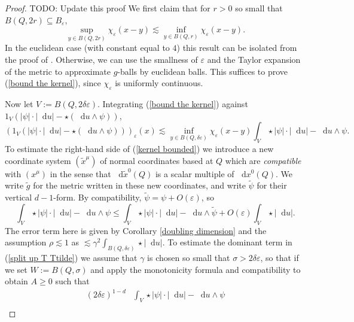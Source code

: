 \documentclass[reqno,10pt]{amsart}
\newcommand*\dif{\mathop{}\!\mathrm{d}}
\newcommand{\dfn}[1]{\emph{#1}\index{#1}}
\theoremstyle{definition}
\numberwithin{equation}{section}
\begin{document}
\begin{proof}
TODO: Update this proof We first claim that for $r > 0$ so small that $B(Q, 2r) \subseteq B_\varepsilon$,
\begin{equation}\label{bound the kernel}
\sup_{y \in B(Q, 2r)} \chi_\varepsilon(x - y) \lesssim \inf_{y \in B(Q, r)} \chi_\varepsilon(x - y).
\end{equation}
In the euclidean case (with constant equal to $4$) this result can be isolated from the proof of \cite[Theorem 7.3]{Giusti77}.
Otherwise, we can use the smallness of $\varepsilon$ and the Taylor expansion of the metric to approximate $g$-balls by euclidean balls.
This suffices to prove (\ref{bound the kernel}), since $\chi_\varepsilon$ is uniformly continuous.

Now let $V := B(Q, 2\delta\varepsilon)$.
Integrating (\ref{bound the kernel}) against $1_V(|\psi| \cdot |\dif u| - \star(\dif u \wedge \psi))$,
\begin{equation}\label{kernel bounded}
(1_V(|\psi| \cdot |\dif u| - \star(\dif u \wedge \psi)))_\varepsilon(x) \lesssim \inf_{y \in B(Q, \delta\varepsilon)} \chi_\varepsilon(x - y) \int_V \star |\psi| \cdot |\dif u| - \dif u \wedge \psi.
\end{equation}
To estimate the right-hand side of (\ref{kernel bounded}) we introduce a new coordinate system $(\tilde x^\mu)$ of normal coordinates based at $Q$ which are \dfn{compatible} with $(x^\mu)$ in the sense that $\dif \tilde x^0(Q)$ is a scalar multiple of $\dif x^0(Q)$.
We write $\tilde g$ for the metric written in these new coordinates, and write $\tilde \psi$ for their vertical $d-1$-form.
By compatibility, $\tilde \psi = \psi + O(\varepsilon)$, so
\begin{equation}\label{split up T Ttilde}
\int_V \star |\psi| \cdot |\dif u| - \dif u \wedge \psi \leq \int_V \star |\psi| \cdot |\dif u| - \dif u \wedge \tilde \psi + O(\varepsilon) \int_V \star |\dif u|.
\end{equation}
The error term here is given by Corollary \ref{doubling dimension} and the assumption $\rho \lesssim 1$ as $\lesssim \gamma^2 \int_{B(Q, \delta\varepsilon)} \star |\dif u|$.
To estimate the dominant term in (\ref{split up T Ttilde}) we assume that $\gamma$ is chosen so small that $\sigma > 2\delta\varepsilon$, so that if we set $W := B(Q, \sigma)$ and apply the monotonicity formula and compatibility to obtain $A \geq 0$ such that
\begin{align*}
(2\delta\varepsilon)^{1 - d} &\int_V \star |\psi| \cdot |\dif u| - \dif u \wedge \psi \\

\end{align*}
\end{proof}
\end{document}
